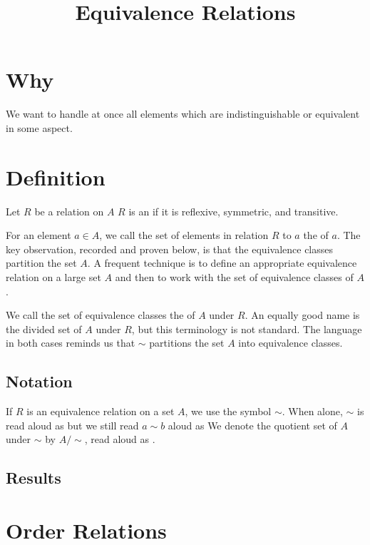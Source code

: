 





\title{Equivalence Relations}

\section{Why}

We want to handle at once all elements which are indistinguishable or equivalent in some aspect.

\section{Definition}

Let $R$ be a relation on $A$
$R$ is an  if it is reflexive, symmetric, and transitive.

For an element $a \in A$, we call the set of elements in relation $R$ to $a$ the  of $a$.
The key observation, recorded and proven below, is that the equivalence classes partition the set $A$.
A frequent technique is to define an appropriate equivalence relation on a large set $A$ and then to work with the set of equivalence classes of $A$.

We call the set of equivalence classes the  of $A$ under $R$.
An equally good name is the divided set of $A$ under $R$, but this terminology is not standard.
The language in both cases reminds us that $\sim$ partitions the set $A$ into equivalence classes.

\subsection{Notation}
If $R$ is an equivalence relation on a set $A$, we use the symbol $\sim$.
When alone, $\sim$ is read aloud as  but we still read $a \sim b$ aloud as 
We denote the quotient set of  $A$ under $\sim$ by $A/\sim$, read aloud as .

\subsection{Results}

\section{Order Relations}

